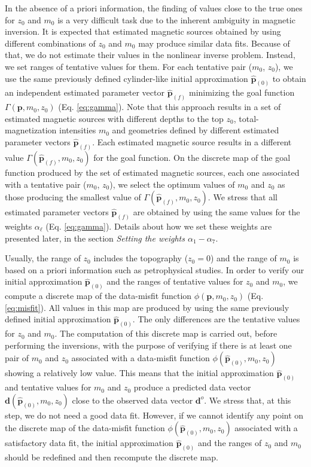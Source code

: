 In the absence of a priori information, the finding of values close to the true ones
for $z_0$ and $m_0$ is a very difficult task due to the inherent ambiguity
in magnetic inversion. It is expected that estimated magnetic sources obtained by
using different combinations of $z_0$ and $m_0$ may produce similar data fits.
Because of that, we do not estimate their values in the nonlinear inverse problem.
Instead, we set ranges of tentative values for them.
For each tentative pair ($m_0$, $z_0$), we use the same previously defined 
cylinder-like initial approximation $\hat{\mathbf{p}}_{(0)}$ to 
obtain an independent estimated parameter vector $\hat{\mathbf{p}}_{(f)}$ 
minimizing the goal function $\Gamma (\mathbf{p}, m_{0}, z_{0})$ 
(Eq. \ref{eq:gamma}).
Note that this approach results in a set of estimated magnetic sources with
different depths to the top $z_0$, total-magnetization intensities $m_0$ and 
geometries defined by different estimated parameter vectors $\hat{\mathbf{p}}_{(f)}$.
Each estimated magnetic source results in a different value 
$\Gamma (\hat{\mathbf{p}}_{(f)}, m_{0}, z_{0})$ for the goal function.
On the discrete map of the goal function produced by the set of estimated magnetic
sources, each one associated with a tentative pair ($m_0$, $z_0$), 
we select the optimum values of $m_{0}$ and $z_{0}$ as those producing the smallest
value of $\Gamma (\hat{\mathbf{p}}_{(f)}, m_{0}, z_{0})$. 
We stress that all estimated parameter vectors $\hat{\mathbf{p}}_{(f)}$ are obtained
by using the same values for the weights $\alpha_{\ell}$ (Eq. \ref{eq:gamma}).
Details about how we set these weights are presented later, in the section
\textit{Setting the weights $\alpha_{1}-\alpha_{7}$}.

Usually, the range of $z_0$ includes the topography ($z_0 = 0$) and the range of 
$m_0$ is based on a priori information such as petrophysical studies.
In order to verify our initial approximation $\hat{\mathbf{p}}_{(0)}$ and the
ranges of tentative values for $z_0$ and $m_0$, we compute a discrete map
of the data-misfit function $\phi (\mathbf{p}, m_{0}, z_{0})$ (Eq. \ref{eq:misfit}).
All values in this map are produced by using the same previously defined 
initial approximation $\hat{\mathbf{p}}_{(0)}$. The only differences are the 
tentative values for $z_0$ and $m_0$. 
The computation of this discrete map is carried out, before performing the 
inversions, with the purpose of verifying if there is at least one pair of $ m_0 $ and $ z_0 $ 
associated with a data-misfit function $\phi (\hat{\mathbf{p}}_{(0)}, m_{0}, z_{0})$ 
showing a relatively low value. This means that the initial approximation $\hat{\mathbf{p}}_{(0)}$
and tentative values for $m_{0}$ and $z_{0}$ produce a predicted data vector 
$\mathbf{d}(\hat{\mathbf{p}}_{(0)}, m_{0}, z_{0})$ close to the observed 
data vector $\mathbf{d}^{o}$.
We stress that, at this step, we do not need a good data fit.
However, if we cannot identify any point on the discrete map of the data-misfit function 
$\phi (\hat{\mathbf{p}}_{(0)}, m_{0}, z_{0})$ associated with a satisfactory
data fit, the initial approximation $\hat{\mathbf{p}}_{(0)}$ 
and the ranges of $ z_0 $ and $ m_0 $ should be redefined and then recompute the discrete map.

